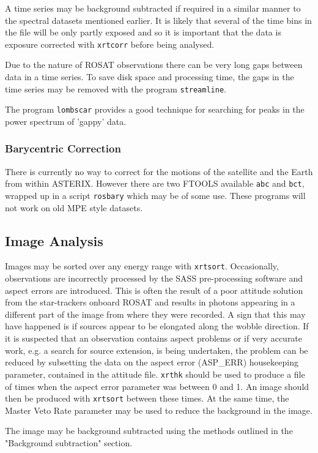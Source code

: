 \documentclass[11pt,fleqn]{article}    %
\begin{document}
A time series may be background subtracted if required in a similar
manner to the spectral datasets mentioned earlier. It is likely that 
several of the time bins in the file will be only partly exposed and so 
it is important that the data is exposure corrected with {\tt xrtcorr} before
being analysed. 

Due to the nature of ROSAT observations there can be very long
gaps between data in a time series. To save disk space and processing time,
the gaps in the time series may be removed with the program {\tt streamline}.

The program {\tt lombscar} provides a good technique for searching for peaks
in the power spectrum of 'gappy' data.

\subsubsection{Barycentric Correction}
There is currently no way to correct for the motions of the satellite and
the Earth from within ASTERIX.  However there are two FTOOLS available
{\tt abc} and {\tt bct}, wrapped up in a script {\tt rosbary} which may be
of some use.  These programs will not work on old MPE style datasets.

\subsection{Image Analysis}
Images may be sorted over any energy range with {\tt xrtsort}. Occasionally,
observations are incorrectly processed by the SASS pre-processing
software and aspect errors are introduced. This is often the result of
a poor attitude solution from the star-trackers onboard ROSAT
and results in photons appearing in a different part of the image
from where they were recorded. A sign that this may have happened
is if sources appear to be elongated along the wobble direction.
If it is suspected that an observation contains aspect problems or if
very accurate work, e.g. a search for source extension, is being undertaken,
the problem can be reduced by subsetting the data on the aspect error
(ASP\_ERR) housekeeping parameter, contained in the attitude
file. {\tt xrthk} should be used to
produce a file of times when the aspect error parameter was between 0 and 1.
An image should then be produced with {\tt xrtsort}
between these times. At the same time, the Master Veto Rate parameter
may be used to reduce the background in the image.

The image may be background subtracted using the methods outlined in 
the "Background subtraction" section. 
\end{document}
